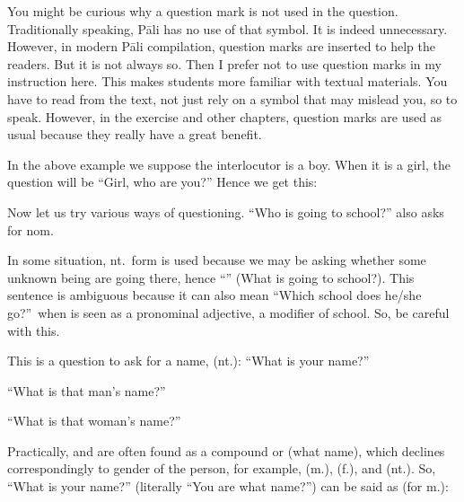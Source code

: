 You might be curious why a question mark is not used in the question. Traditionally speaking, P\=ali has no use of that symbol. It is indeed unnecessary. However, in modern P\=ali compilation, question marks are inserted to help the readers. But it is not always so. Then I prefer not to use question marks in my instruction here. This makes students more familiar with textual materials. You have to read from the text, not just rely on a symbol that may mislead you, so to speak. However, in the exercise and other chapters, question marks are used as usual because they really have a great benefit.

In the above example we suppose the interlocutor is a boy. When it is a girl, the question will be ``Girl, who are you?'' Hence we get this:


Now let us try various ways of questioning. ``Who is going to school?'' also asks for nom.


In some situation, nt.\ form is used because we may be asking whether some unknown being are going there, hence ``'' (What is going to school?). This sentence is ambiguous because it can also mean ``Which school does he/she go?''\ when  is seen as a pronominal adjective, a modifier of school. So, be careful with this.

This is a question to ask for a name,  (nt.): ``What is your name?''


``What is that man's name?''


``What is that woman's name?''


Practically,  and  are often found as a compound  or  (what name), which declines correspondingly to gender of the person, for example,  (m.),  (f.), and  (nt.). So, ``What is your name?'' (literally ``You are what name?'') can be said as (for m.):


